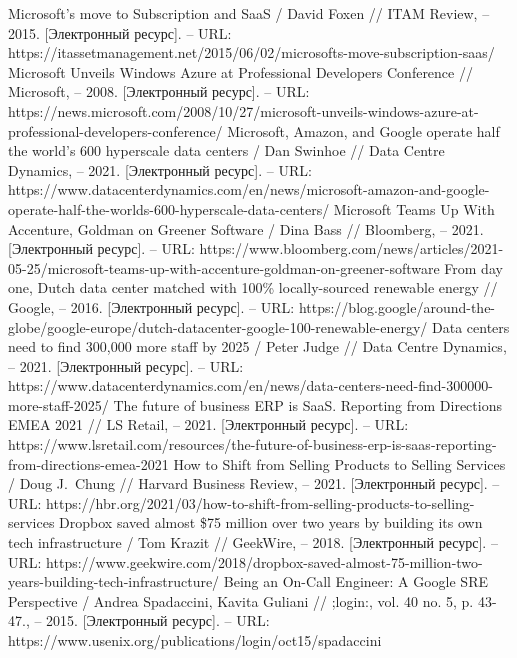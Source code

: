 \documentclass{article}
\begin{document}
\begin{thebibliography}{2}
 Microsoft's move to Subscription and SaaS / David Foxen // ITAM Review, – 2015. [Электронный ресурс]. – URL: https://itassetmanagement.net/2015/06/02/microsofts-move-subscription-saas/
 Microsoft Unveils Windows Azure at Professional Developers Conference // Microsoft, – 2008. [Электронный ресурс]. – URL: https://news.microsoft.com/2008/10/27/microsoft-unveils-windows-azure-at-professional-developers-conference/
 Microsoft, Amazon, and Google operate half the world’s 600 hyperscale data centers / Dan Swinhoe // Data Centre Dynamics, – 2021. [Электронный ресурс]. – URL: https://www.datacenterdynamics.com/en/news/microsoft-amazon-and-google-operate-half-the-worlds-600-hyperscale-data-centers/
 Microsoft Teams Up With Accenture, Goldman on Greener Software / Dina Bass // Bloomberg, – 2021. [Электронный ресурс]. – URL: https://www.bloomberg.com/news/articles/2021-05-25/microsoft-teams-up-with-accenture-goldman-on-greener-software
 From day one, Dutch data center matched with 100\% locally-sourced renewable energy // Google, – 2016. [Электронный ресурс]. – URL: https://blog.google/around-the-globe/google-europe/dutch-datacenter-google-100-renewable-energy/
 Data centers need to find 300,000 more staff by 2025 / Peter Judge // Data Centre Dynamics, – 2021. [Электронный ресурс]. – URL: https://www.datacenterdynamics.com/en/news/data-centers-need-find-300000-more-staff-2025/
 The future of business ERP is SaaS. Reporting from Directions EMEA 2021 // LS Retail, – 2021. [Электронный ресурс]. – URL: https://www.lsretail.com/resources/the-future-of-business-erp-is-saas-reporting-from-directions-emea-2021
 How to Shift from Selling Products to Selling Services / Doug J.~Chung // Harvard Business Review, – 2021. [Электронный ресурс]. – URL: https://hbr.org/2021/03/how-to-shift-from-selling-products-to-selling-services
 Dropbox saved almost \$75 million over two years by building its own tech infrastructure / Tom Krazit // GeekWire, – 2018. [Электронный ресурс]. – URL: https://www.geekwire.com/2018/dropbox-saved-almost-75-million-two-years-building-tech-infrastructure/
 Being an On-Call Engineer: A Google SRE Perspective / Andrea Spadaccini, Kavita Guliani // ;login:, vol. 40 no. 5, p. 43-47., – 2015. [Электронный ресурс]. – URL: https://www.usenix.org/publications/login/oct15/spadaccini

\end{thebibliography}
\end{document}
